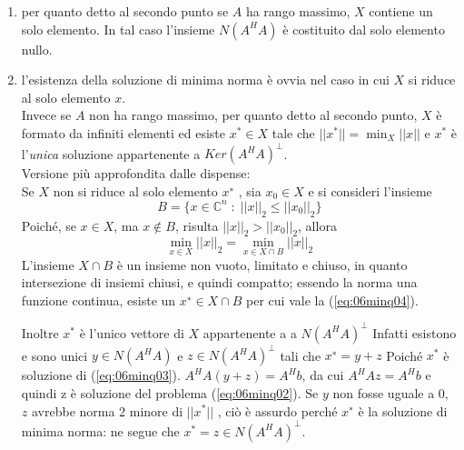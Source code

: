 \begin{thproof}
\begin{enumerate}
Mostriamo ora che $X$ è chiuso e convesso:
\begin{enumerate}
\item caso $rank(A) = n$ \\ 
  $A^{H}A$ è definita positiva non singolare, $A^{H}Ax = A^{H}b$ ha
  soluzione unica ed $X$ è formato da un solo vettore.
\item caso $rank(A) < n$\\ 
  $A^{H}A$ è semi-definita positiva, $det(A^H A) = 0$,
  abbiamo infinite soluzioni delle forma
  $$X = \{ x = x_0 + v\} \qquad v \in Ker(A^{H}A)$$
  e poich\'e $N(A^{H} A)$ \`e chiuso e convesso, $X$ un insieme chiuso
  e convesso.\\

  Ad esempio poniamo che il rango sia 1 in $\mathbb{R}^2$ con $n =2$,
  allora $dim(Ker(A^{H}A)) = 1$ e $rank(A^{H}A) = 1$, l'insieme delle
  soluzioni $X$ è una retta, che è un insieme chiuso e convesso.
\end{enumerate}

\item per quanto detto al secondo punto se $A$ ha rango massimo, $X$
  contiene un solo elemento. In tal caso l'insieme $N (A^{H} A)$ \`e 
  costituito dal solo elemento nullo.

\item l'esistenza della soluzione di minima norma \`e ovvia
  nel caso in cui $X$ si riduce al solo elemento $x$.\\
  Invece se $A$ non ha rango massimo, per quanto detto al secondo punto, $X$
  è formato da infiniti elementi ed esiste $x^{*} \in X$ tale che
  $||x^{*}|| = \min_{X} ||x||$ e $x^{*}$ è l'\emph{unica} soluzione
  appartenente a $Ker(A^H A)^{\bot}$.\\

  Versione più approfondita dalle dispense:\\
  Se $X$ non si riduce al solo elemento $x^{∗}$ , sia $x_0 \in X$ e si consideri
  l’insieme
  $$ B = \{ x \in \mathbb{C}^{n}\; : \; ||x||_{2} \leq ||x_0||_2 \}$$
  Poich\'e, se $x \in X$, ma $x \notin B$, risulta $||x||_{2} >
  ||x_0||_{2}$, allora
  $$  \displaystyle 
  \min_{x \in X} ||x||_{2} = \min_{x \in X \cap B} ||x||_{2}
  $$
  L'insieme $X \cap B$ \`e un insieme non vuoto, limitato e chiuso, in
  quanto intersezione di insiemi chiusi, e quindi compatto; essendo la
  norma una funzione continua, esiste un $x^∗ \in X \cap B$ per cui vale
  la (\ref{eq:06minq04}).

  Inoltre $x^*$ \`e l'unico vettore di $X$ appartenente a a
  $N(A^{H}A)^{\bot}$ Infatti esistono e sono unici $ y \in N (A^{H} A)$
  e $z \in N (A^{H} A)^{\bot}$ tali che $x^{∗} = y + z$ Poich\'e $x^*$
  \`e soluzione di (\ref{eq:06minq03}).  $ A^{H} A(y + z) = A^H b$, da
  cui $A^H Az = A^H b$ e quindi z \`e soluzione del problema
  (\ref{eq:06minq02}).  Se $y$ non fosse uguale a 0, $z$ avrebbe norma 2
  minore di $||x^*||$ , ci\`o \`e assurdo perch\'e $x^∗$ \`e la
  soluzione di minima norma: ne segue che $x^* = z \in N (A^H A)^{\bot}$.


\end{enumerate}
\end{thproof}
